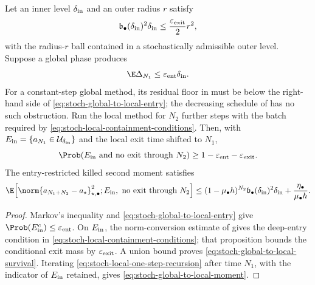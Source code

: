 \begin{corollary}
\label{cor:stoch-global-to-local}
Let an inner level \(\delta_{\rm in}\) and an outer radius \(r\) satisfy
\[
  \mathfrak b_\bullet(\delta_{\rm in})^2\delta_{\rm in}
  \leq\frac{\varepsilon_{\rm exit}}2r^2,
\]
with the radius-\(r\) ball contained in a stochastically admissible outer
level.  Suppose a global phase produces
\begin{equation}
  \E\Delta_{N_1}
  \leq\varepsilon_{\rm ent}\delta_{\rm in}.
  \label{eq:stoch-global-to-local-entry}
\end{equation}
For a constant-step global method, its residual floor in
 must be below the right-hand side of
\eqref{eq:stoch-global-to-local-entry}; the decreasing schedule of
 has no such obstruction.  Run the local
method for \(N_2\) further steps with the batch required by
\eqref{eq:stoch-local-containment-conditions}.  Then, with
\(E_{\rm in}=\{a_{N_1}\in\mathcal U_{\delta_{\rm in}}\}\) and the local
exit time shifted to \(N_1\),
\begin{equation}
  \Prob(E_{\rm in}\text{ and no exit through }N_2)
  \geq1-\varepsilon_{\rm ent}-\varepsilon_{\rm exit}.
  \label{eq:stoch-global-to-local-survival}
\end{equation}
The entry-restricted killed second moment satisfies
\begin{equation}
  \E\!\left[
    \norm{a_{N_1+N_2}-a_\star}_{\star,\bullet}^2;
    E_{\rm in},\ \text{no exit through }N_2
  \right]
  \leq(1-\mu_\bullet h)^{N_2}
  \mathfrak b_\bullet(\delta_{\rm in})^2\delta_{\rm in}
  +\frac{\eta_\bullet}{\mu_\bullet h}.
  \label{eq:stoch-global-to-local-moment}
\end{equation}
\end{corollary}

\begin{proof}
Markov's inequality and \eqref{eq:stoch-global-to-local-entry} give
\(\Prob(E_{\rm in}^c)\leq\varepsilon_{\rm ent}\).  On
\(E_{\rm in}\), the norm-conversion estimate of  gives
the deep-entry condition in
\eqref{eq:stoch-local-containment-conditions}; that proposition bounds the
conditional exit mass by \(\varepsilon_{\rm exit}\).  A union bound proves
\eqref{eq:stoch-global-to-local-survival}.  Iterating
\eqref{eq:stoch-local-one-step-recursion} after time \(N_1\), with the
indicator of \(E_{\rm in}\) retained, gives
\eqref{eq:stoch-global-to-local-moment}.
\end{proof}

